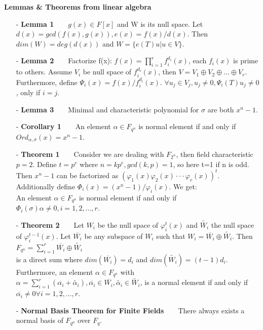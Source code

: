 \documentclass[12pt]{article}
\begin{document}
\textbf{Lemmas \& Theorems from linear algebra}
\begin{itemize}
\item[-] \textbf{Lemma 1}\ \ \ \ $g(x) \in F[x]$ and W is its null space. Let $d(x) = gcd(f(x),g(x)), e(x) = f(x)/d(x)$. Then $dim(W) = deg(d(x))$ and $W = \{e(T)u | u \in V\}$.
\item[-] \textbf{Lemma 2}\ \ \ \ Factorize f(x): $f(x) = \prod_{i=1}^{r} f_{i}^{d_i} (x)$, each $f_i(x)$ is prime to others. Assume $V_i$ be null space of $f_{i}^{d_i} (x)$, then $V = V_1\oplus V_2 \oplus ...\oplus V_r$.
Furthermore, define $\Psi_i(x) = f(x)/f_{i}^{d_i} (x)$. $\forall u_j \in V_j, u_j \neq 0, \Psi_i(T)u_j \neq 0$, only if $i = j$.
\item[-] \textbf{Lemma 3}\ \ \ \ Minimal and characteristic polynomial for $\sigma$ are both $x^n - 1$.
\item[-] \textbf{Corollary 1}\ \ \ \ An element $\alpha \in F_{q^n}$ is normal element if and only if $Ord_{\alpha,\sigma}(x) = x^n - 1$.
\item[-] \textbf{Theorem 1}\ \ \ \ Consider we are dealing with $F_{2^n}$, then field characteristic $p = 2$.
				Define $t = p^e$ where $n = kp^e, gcd(k,p) = 1$, so here t=1 if n is odd. Then 
			$x^n - 1$ can be factorized as $(\varphi_1(x)\varphi_2(x)\cdot\cdot\cdot\varphi_r(x))^t$.
			Additionally define $\Phi_i(x) = (x^n - 1)/\varphi_i(x)$. We get: \\ 
			An element $\alpha \in 	F_{q^n}$ is normal element if and only if $\Phi_i(\sigma)\alpha \neq 0, i = 1,2,...,r$.
\item[-] \textbf{Theorem 2}\ \ \ \ Let $W_i$ be the null space of $\varphi_{i}^{t} (x)$ and $\widetilde{W_i}$ the
				 null space of $\varphi_{i}^{t-1} (x)$. Let $\overline{W_i}$ be any subspace of
			 $W_i$ such that $W_i = \overline{W_i}\oplus \widetilde{W_i}$. Then\\
			$F_{q^n} = \displaystyle\sum_{i=1}^{r} \overline{W_i}\oplus \widetilde{W_i}$ \\
			is a direct sum where $dim(\overline{W_i}) = d_i$ and $dim(\widetilde{W_i}) = (t-1)d_i$.\\
			Furthermore, an element $\alpha \in F_{q^n}$ with $\alpha = \sum_{i=1}^{r} (\overline{\alpha_i} + \widetilde{\alpha_i}), \overline{\alpha_i} \in \overline{W_i}, \widetilde{\alpha_i} \in \widetilde{W_i}$,
			is a normal element if and only if $\overline{\alpha_i} \neq 0 \forall i = 1,2,...,r$.
\item[-] \textbf{Normal Basis Theorem for Finite Fields}\ \ \ \ There always exists a normal basis of $F_{q^n}$ over $F_q$.
\end{itemize}
\end{document}
